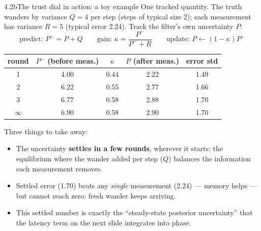 \documentclass[10pt]{beamer}
\newcommand{\srcline}[1]{\par\vfill\noindent{\tiny\textcolor{gray}{Source: #1}}}
\begin{document}
\begin{frame}{4.2b\quad The trust dial in action: a toy example}
\footnotesize
One tracked quantity. The truth wanders by variance $Q=4$ per step
(steps of typical size 2); each measurement has variance $R=5$ (typical
error 2.24). Track the filter's own uncertainty $P$:
\[
\text{predict: } P^-\!=P+Q
\qquad
\text{gain: } \kappa=\frac{P^-}{P^-+R}
\qquad
\text{update: } P\leftarrow(1-\kappa)P^-
\]
\begin{center}
\small
\begin{tabular}{ccccc}
\toprule
round & $P^-$ (before meas.) & $\kappa$ & $P$ (after meas.) & error std\\
\midrule
1 & 4.00 & 0.44 & 2.22 & 1.49\\
2 & 6.22 & 0.55 & 2.77 & 1.66\\
3 & 6.77 & 0.58 & 2.88 & 1.70\\
$\infty$ & 6.90 & 0.58 & 2.90 & 1.70\\
\bottomrule
\end{tabular}
\end{center}
Three things to take away:
\begin{itemize}
\item The uncertainty \textbf{settles in a few rounds}, wherever it
starts: the equilibrium where the wander added per step ($Q$) balances
the information each measurement removes.
\item Settled error (1.70) beats any \emph{single} measurement (2.24)
--- memory helps --- but cannot reach zero: fresh wander keeps arriving.
\item This settled number is exactly the ``steady-state posterior
uncertainty'' that the latency term on the next slide integrates into
phase.
\end{itemize}
\srcline{Standard scalar Kalman recursion; numbers chosen for arithmetic clarity.}
\end{frame}
\end{document}
